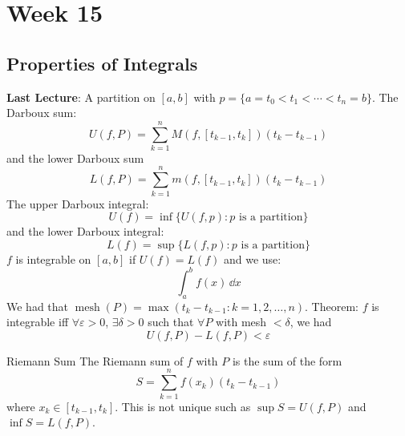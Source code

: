 \documentclass{report}
\begin{document}
\chapter{Week 15}

\begin{topic}
    \section{Properties of Integrals}
\end{topic}

\textbf{Last Lecture}: A partition on $[a, b]$ with $p = \{a = t_{0} < t_{ 1} < \cdots < t_{ n} = b\}$. The Darboux sum:
    \begin{equation*}
        U(f, P) = \sum_{ k = 1}^{n}M(f, [t_{k - 1}, t_{k}]) (t_{k} - t_{k - 1})
    \end{equation*}
and the lower Darboux sum
    \begin{equation*}
        L(f, P) = \sum_{ k = 1}^{n}m(f, [t_{k - 1}, t_{k}]) (t_{k} - t_{k - 1})
    \end{equation*}
The upper Darboux integral:
    \begin{equation*}
        U(f) = \inf \{ U(f, p) : p \text{ is a partition}\}
    \end{equation*}
and the lower Darboux integral:
    \begin{equation*}
        L(f) = \sup \{ L(f, p) : p \text{ is a partition}\}
    \end{equation*}
$f$ is integrable on $[a, b]$ if $U(f) = L(f)$ and we use:
    \begin{equation*}
        \int_{a}^{b} f(x) \, \dd{x} 
    \end{equation*}
We had that $\mathop{mesh}(P) = \max(t_{k} - t_{k - 1} : k = 1, 2, \ldots, n)$. Theorem: $f$ is integrable iff $\forall \varepsilon>  0$, $\exists \delta>  0$ such that $\forall P$ with mesh $ < \delta$, we had
    \begin{equation*}
        U(f, P) - L(f, P) < \varepsilon
    \end{equation*}

\begin{definition}{Riemann Sum}
    The Riemann sum of $f$ with $P$ is the sum of the form
        \begin{equation*}
            S = \sum_{ k = 1}^{n}f(x_{k})(t_{k} - t_{k - 1})
        \end{equation*}
    where $x_{k} \in [ t_{k - 1}, t_{k}]$. This is not unique such as $\sup S = U( f, P)$ and $\inf S = L( f, P)$.
\end{definition}
\end{document}
